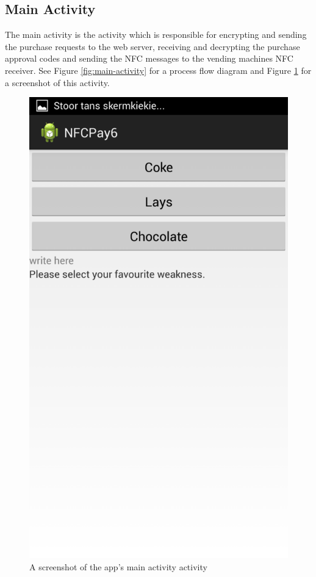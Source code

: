\subsection{Main Activity}

The main activity is the activity which is responsible for encrypting and
sending the purchase requests to the web server, receiving and decrypting
the purchase approval codes and sending the NFC messages to the vending machines
NFC receiver. See Figure \ref{fig:main-activity} for a process flow diagram
and Figure \ref{fig:main-activity-screenshot} for a screenshot of this activity.

\begin{figure}[h]
 \centering 
 \includegraphics[clip = true, trim = 0 520 0 60,
 scale=0.2]{main_menu}
 \caption{A screenshot of the app's main activity activity}
 \label{fig:main-activity-screenshot}
\end{figure}


